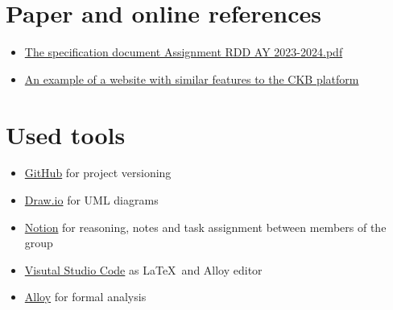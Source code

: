 \section{Paper and online references}
\label{sec:paper_references}%
\begin{itemize}
    \item \href{https://polimi365-my.sharepoint.com/:b:/g/personal/10710351_polimi_it/EZXUPFfeFKdBkf5M8W-EBYgB2JrrVLr23BYJ4MXQ7kzUkA?e=o0wvyw}{The specification document Assignment RDD AY 2023-2024.pdf}
    \item \href{https://www.codewars.com/}{An example of a website with similar features to the CKB platform}
\end{itemize}


\section{Used tools}
\label{sec:used_tools}%
\begin{itemize}
    \item \href{https://github.com/}{GitHub} for project versioning
    \item \href{https://draw.io/}{Draw.io} for UML diagrams
    \item \href{https://www.notion.so/}{Notion} for reasoning, notes and task assignment between members of the group
    \item \href{https://code.visualstudio.com/}{Visutal Studio Code} as \LaTeX\ and Alloy editor
    \item \href{https://alloytools.org/}{Alloy} for formal analysis
\end{itemize}
